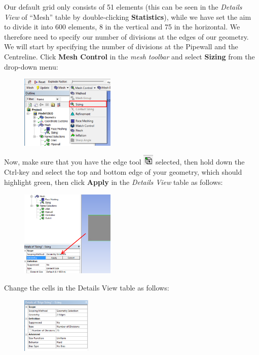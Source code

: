 \documentclass[11pt,a4paper,oneside]{scrartcl}
\newcommand\bfr[1]{\textcolor[rgb]{1,0.00,0.00}{\textbf{\textsf{#1}}}}
\begin{document}
Our default grid only consists of 51 elements (this can be seen in the \emph{Details View} of ``Mesh'' table by double-clicking \bfr{Statistics}), while we have set the aim to divide it into 600 elements, 8 in the vertical and 75 in the horizontal. We therefore need to specify our number of divisions at the edges of our geometry.
We will start by specifying the number of divisions at the Pipewall and the Centreline. Click \bfr{Mesh Control} in the \emph{mesh toolbar} and select \bfr{Sizing} from the drop-down menu:
\begin{figure}[H]
\begin{center}
\includegraphics[width=0.4\textwidth,clip]{mesh_sizing.png}
\end{center}
\end{figure}
Now, make sure that you have the edge tool \includegraphics[width=0.5cm]{edge_tool.png} selected, then hold down the Ctrl-key and select the top and bottom edge of your geometry, which should highlight green, then click \bfr{Apply} in the \emph{Details View} table as follows:
\begin{figure}[H]
\begin{center}
\includegraphics[width=0.4\textwidth,clip]{apply_edge_sizing.png}
\end{center}
\end{figure}
Change the cells in the Details View table as follows:
\begin{figure}[H]
\begin{center}
\includegraphics[width=0.3\textwidth,clip]{Details_of_sizing.png}
\end{center}
\end{figure}
\end{document}
